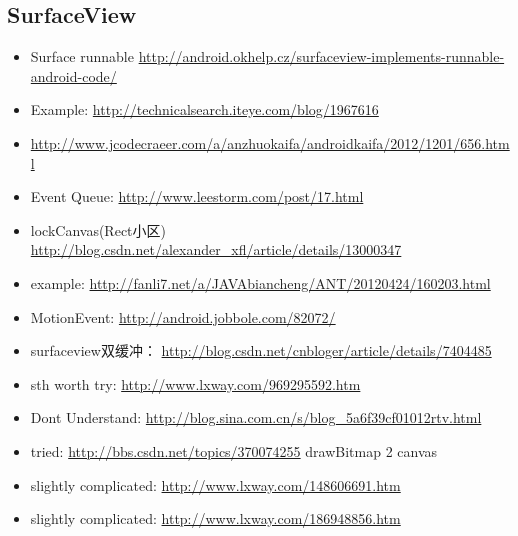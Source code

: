 \documentclass[9pt,b5paper]{article}
\begin{document}
\subsection{SurfaceView}
\label{sec-2-7}
\begin{itemize}
\item Surface runnable \url{http://android.okhelp.cz/surfaceview-implements-runnable-android-code/}
\item Example: \url{http://technicalsearch.iteye.com/blog/1967616}
\item \url{http://www.jcodecraeer.com/a/anzhuokaifa/androidkaifa/2012/1201/656.html}
\item Event Queue: \url{http://www.leestorm.com/post/17.html}
\item lockCanvas(Rect小区) \url{http://blog.csdn.net/alexander_xfl/article/details/13000347}
\item example: \url{http://fanli7.net/a/JAVAbiancheng/ANT/20120424/160203.html}
\item MotionEvent: \url{http://android.jobbole.com/82072/}
\item surfaceview双缓冲： \url{http://blog.csdn.net/cnbloger/article/details/7404485}
\item sth worth try: \url{http://www.lxway.com/969295592.htm}
\item Dont Understand: \url{http://blog.sina.com.cn/s/blog_5a6f39cf01012rtv.html}
\item tried: \url{http://bbs.csdn.net/topics/370074255} drawBitmap 2 canvas
\item slightly complicated: \url{http://www.lxway.com/148606691.htm}
\item slightly complicated: \url{http://www.lxway.com/186948856.htm}
\end{itemize}
\end{document}
